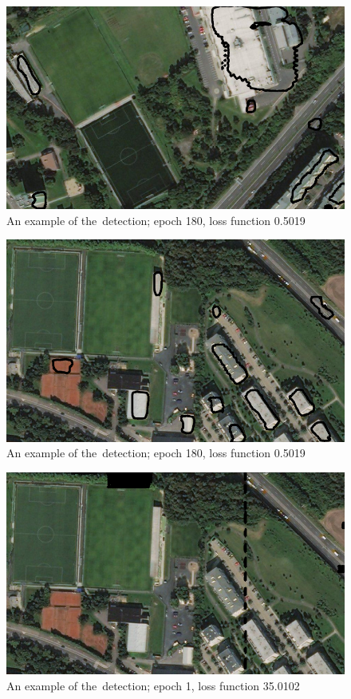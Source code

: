 \begin{figure}[H]
   \centering
	\includegraphics[width=.9\linewidth]{./pictures/out_b_180_2.png}
	\caption[Detection of buildings, example]{An example of the~detection; epoch
	180, loss function 0.5019}
      \label{fig:build-2}
\end{figure}

\begin{figure}[H]
   \centering
	\includegraphics[width=.9\linewidth]{./pictures/out_b_180.png}
	\caption[Detection of buildings, example]{An example of the~detection; epoch
	180, loss function 0.5019}
      \label{fig:build-1}
\end{figure}

\begin{figure}[H]
   \centering
	\includegraphics[width=.9\linewidth]{./pictures/out_b_1.png}
	\caption[Detection of buildings, example]{An example of the~detection; epoch
	1, loss function 35.0102}
      \label{fig:build-3}
\end{figure}

